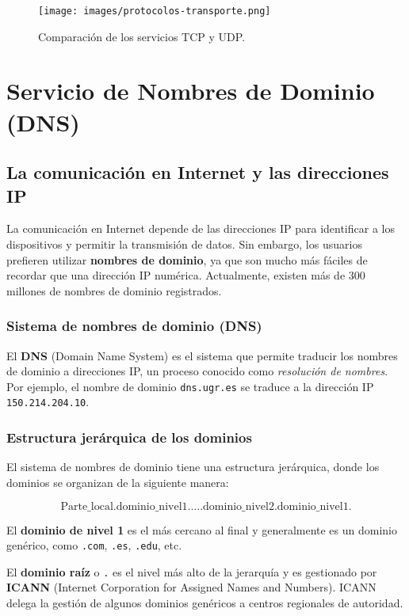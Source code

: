 \documentclass[a4paper,12pt]{article}
\begin{document}
\begin{figure}[H]
    \centering
    \texttt{[image: images/protocolos-transporte.png]}
    \caption{Comparación de los servicios TCP y UDP.}
    \label{fig:protocolos-transporte}
\end{figure}

\section{Servicio de Nombres de Dominio (DNS)}

\subsection{La comunicación en Internet y las direcciones IP}

La comunicación en Internet depende de las direcciones IP para identificar a los dispositivos y permitir la transmisión de datos. Sin embargo, los usuarios prefieren utilizar \textbf{nombres de dominio}, ya que son mucho más fáciles de recordar que una dirección IP numérica. Actualmente, existen más de 300 millones de nombres de dominio registrados.

\subsubsection{Sistema de nombres de dominio (DNS)}

El \textbf{DNS} (Domain Name System) es el sistema que permite traducir los nombres de dominio a direcciones IP, un proceso conocido como \emph{resolución de nombres}. Por ejemplo, el nombre de dominio \texttt{dns.ugr.es} se traduce a la dirección IP \texttt{150.214.204.10}.

\subsubsection{Estructura jerárquica de los dominios}

El sistema de nombres de dominio tiene una estructura jerárquica, donde los dominios se organizan de la siguiente manera:

\[
\text{Parte\_local.dominio\_nivel1.}\dots.\text{dominio\_nivel2.dominio\_nivel1.}
\]

El \textbf{dominio de nivel 1} es el más cercano al final y generalmente es un dominio genérico, como \texttt{.com}, \texttt{.es}, \texttt{.edu}, etc.

El \textbf{dominio raíz} o \texttt{.} es el nivel más alto de la jerarquía y es gestionado por \textbf{ICANN} (Internet Corporation for Assigned Names and Numbers). ICANN delega la gestión de algunos dominios genéricos a centros regionales de autoridad.
\end{document}

